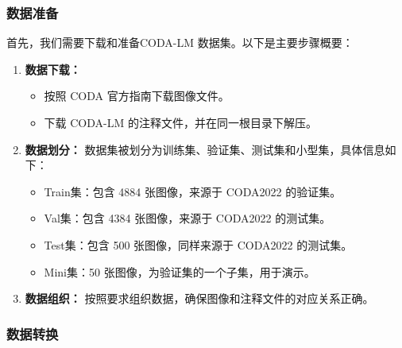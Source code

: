 \documentclass[
    linespread = 1.25
]{ctexart}
\begin{document}
\subsubsection{数据准备}
首先，我们需要下载和准备CODA-LM 数据集。以下是主要步骤概要：

\begin{enumerate}
  \item \textbf{数据下载：}
        \begin{itemize}
          \item 按照 CODA 官方指南下载图像文件。
          \item 下载 CODA-LM 的注释文件，并在同一根目录下解压。
        \end{itemize}

  \item \textbf{数据划分：} 数据集被划分为训练集、验证集、测试集和小型集，具体信息如下：
        \begin{itemize}
          \item Train集：包含 4884 张图像，来源于 CODA2022 的验证集。
          \item Val集：包含 4384 张图像，来源于 CODA2022 的测试集。
          \item Test集：包含 500 张图像，同样来源于 CODA2022 的测试集。
          \item Mini集：50 张图像，为验证集的一个子集，用于演示。
        \end{itemize}
  \item \textbf{数据组织：} 按照要求组织数据，确保图像和注释文件的对应关系正确。
\end{enumerate}

\subsubsection{数据转换}
\end{document}
